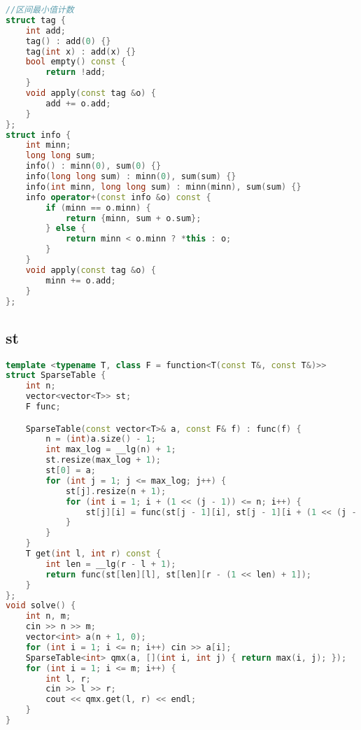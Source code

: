 \begin{lstlisting}[language=C++]
//区间最小值计数
struct tag {
    int add;
    tag() : add(0) {}
    tag(int x) : add(x) {}
    bool empty() const {
        return !add;
    }
    void apply(const tag &o) {
        add += o.add;
    }
};
struct info {
    int minn;
    long long sum;
    info() : minn(0), sum(0) {}
    info(long long sum) : minn(0), sum(sum) {}
    info(int minn, long long sum) : minn(minn), sum(sum) {}
    info operator+(const info &o) const {
        if (minn == o.minn) {
            return {minn, sum + o.sum};
        } else {
            return minn < o.minn ? *this : o;
        }
    }
    void apply(const tag &o) {
        minn += o.add;
    }
};
\end{lstlisting}
\subsection{st}
\begin{lstlisting}[language=C++]
template <typename T, class F = function<T(const T&, const T&)>>
struct SparseTable {
    int n;
    vector<vector<T>> st;
    F func;

    SparseTable(const vector<T>& a, const F& f) : func(f) {
        n = (int)a.size() - 1;
        int max_log = __lg(n) + 1;
        st.resize(max_log + 1);
        st[0] = a;
        for (int j = 1; j <= max_log; j++) {
            st[j].resize(n + 1);
            for (int i = 1; i + (1 << (j - 1)) <= n; i++) {
                st[j][i] = func(st[j - 1][i], st[j - 1][i + (1 << (j - 1))]);
            }
        }
    }
    T get(int l, int r) const {
        int len = __lg(r - l + 1);
        return func(st[len][l], st[len][r - (1 << len) + 1]);
    }
};
void solve() {
    int n, m;
    cin >> n >> m;
    vector<int> a(n + 1, 0);
    for (int i = 1; i <= n; i++) cin >> a[i];
    SparseTable<int> qmx(a, [](int i, int j) { return max(i, j); });
    for (int i = 1; i <= m; i++) {
        int l, r;
        cin >> l >> r;
        cout << qmx.get(l, r) << endl;
    }
}

\end{lstlisting}
